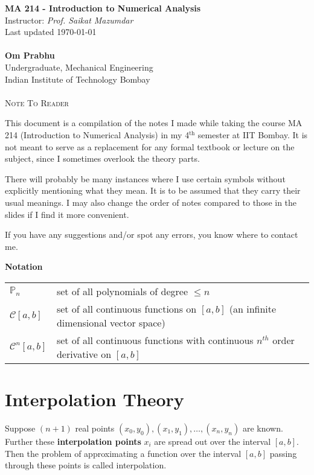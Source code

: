 \documentclass[11pt]{article}
\theoremstyle{definition}
\begin{document}
\begin{center}
{\LARGE \bf MA 214 - Introduction to Numerical Analysis}\\
{Instructor: \textit{Prof. Saikat Mazumdar}}\\
Last updated \today \\~\\
{\large \bf Om Prabhu}\\
Undergraduate, Mechanical Engineering\\
Indian Institute of Technology Bombay\\~\\
\textsc{Note To Reader}
\end{center}
\vspace{-6pt}

This document is a compilation of the notes I made while taking the course MA 214 (Introduction to Numerical Analysis) in my 4$^{\text{th}}$ semester at IIT Bombay. It is not meant to serve as a replacement for any formal textbook or lecture on the subject, since I sometimes overlook the theory parts.

There will probably be many instances where I use certain symbols without explicitly mentioning what they mean. It is to be assumed that they carry their usual meanings. I may also change the order of notes compared to those in the slides if I find it more convenient.

If you have any suggestions and/or spot any errors, you know where to contact me.

\hrulefill
\vspace{-5mm}
\tableofcontents
\hrulefill
\vspace{2mm}

{\large \bf Notation}
\vspace{2mm}

\begin{tabular}{p{}p{}}
$\mathbb{P}_n$ & set of all polynomials of degree $\leqslant n$\\
$\mathcal{C}[a,b]$ & set of all continuous functions on $[a,b]$ (an infinite dimensional vector space)\\
$\mathcal{C}^n[a,b]$ & set of all continuous functions with continuous $n^{th}$ order derivative on $[a,b]$ 
\end{tabular}
\vspace{-2mm}
 
\hrulefill

\newpage
\section{Interpolation Theory}
Suppose $(n+1)$ real points $(x_0,y_0), (x_1,y_1),\dots,(x_n,y_n)$ are known. Further these \textbf{interpolation points} $x_i$ are spread out over the interval $[a,b]$. Then the problem of approximating a function over the interval $[a,b]$ passing through these points is called interpolation.
\end{document}
